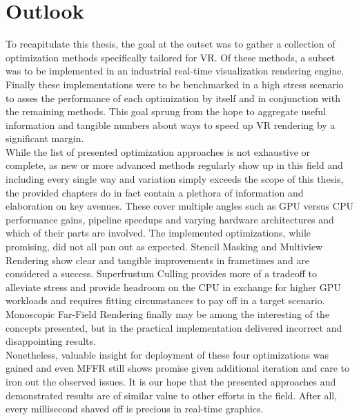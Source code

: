 
\chapter{Outlook}
To recapitulate this thesis, the goal at the outset was to gather a collection of optimization methods specifically tailored for \gls{VR}. Of these methods, a subset was to be implemented in an industrial real-time visualization rendering engine. Finally these implementations were to be benchmarked in a high stress scenario to asses the performance of each optimization by itself and in conjunction with the remaining methods. This goal sprung from the hope to aggregate useful information and tangible numbers about ways to speed up \gls{VR} rendering by a significant margin. \\
While the list of presented optimization approaches is not exhaustive or complete, as new or more advanced methods regularly show up in this field and including every single way and variation simply exceeds the scope of this thesis, the provided chapters do in fact contain a plethora of information and elaboration on key avenues. These cover multiple angles such as GPU versus CPU performance gains, pipeline speedups and varying hardware architectures and which of their parts are involved. 
The implemented optimizations, while promising, did not all pan out as expected. Stencil Masking and Multiview Rendering show clear and tangible improvements in frametimes and are considered a success. Superfrustum Culling provides more of a tradeoff to alleviate stress and provide headroom on the CPU in exchange for higher GPU workloads and requires fitting circumstances to pay off in a target scenario. Monoscopic Far-Field Rendering finally may be among the interesting of the concepts presented, but in the practical implementation delivered incorrect and disappointing results. \\
Nonetheless, valuable insight for deployment of these four optimizations was gained and even \gls{MFFR} still shows promise given additional iteration and care to iron out the observed issues. It is our hope that the presented approaches and demonstrated results are of similar value to other efforts in the field. After all, every millisecond shaved off is precious in real-time graphics. 
